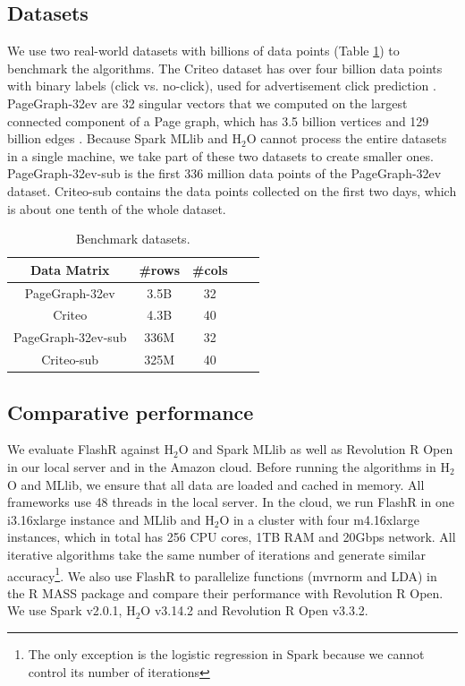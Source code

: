 \subsection{Datasets}\label{sec:data}
We use two real-world datasets with billions of data points (Table \ref{tbl:data})
to benchmark the algorithms. The Criteo dataset has over four billion data
points with binary labels (click vs. no-click), used for advertisement click
prediction \cite{criteo}. PageGraph-32ev are 32 singular vectors that we computed
on the largest connected component of a Page graph, which has 3.5 billion vertices and
129 billion edges \cite{webgraph}. Because Spark MLlib and H$_2$O cannot process
the entire datasets in a single machine, we take part of these two datasets
to create smaller ones.
PageGraph-32ev-sub is the first 336 million data points
of the PageGraph-32ev dataset. Criteo-sub contains the data points collected
on the first two days, which is about one tenth of the whole dataset.

\begin{table}
\begin{center}
\caption{Benchmark datasets.}
\vspace{-10pt}
\footnotesize
\begin{tabular}{|c|c|c|c|c|}
\hline
Data Matrix & \#rows & \#cols \\
\hline
PageGraph-32ev \cite{webgraph} & 3.5B & 32 \\
\hline
Criteo \cite{criteo} & 4.3B & 40 \\
\hline
PageGraph-32ev-sub \cite{webgraph} & 336M & 32 \\
\hline
Criteo-sub \cite{criteo} & 325M & 40 \\
\hline
\end{tabular}
\normalsize
\label{tbl:data}
\end{center}
\vspace{-10pt}
\end{table}

\subsection{Comparative performance}
We evaluate FlashR against H$_2$O \cite{h2o} and Spark MLlib \cite{mllib} as well
as Revolution R Open \cite{rro} in our local server and in the Amazon cloud.
Before running the algorithms in H$_2$O and MLlib, we ensure that all data are
loaded and cached in memory. All frameworks use 48 threads in the local server.
In the cloud, we run FlashR in one i3.16xlarge instance
and MLlib and H$_2$O in a cluster with four m4.16xlarge instances,
which in total has 256 CPU cores, 1TB RAM and 20Gbps network.
All iterative algorithms take the same number of iterations and generate
similar accuracy\footnote{The only exception is the logistic regression in Spark
because we cannot control its number of iterations}.
We also use FlashR to parallelize functions (mvrnorm and LDA)
in the R MASS package and compare their performance with Revolution R Open. We use
Spark v2.0.1, H$_2$O v3.14.2 and Revolution R Open v3.3.2.

